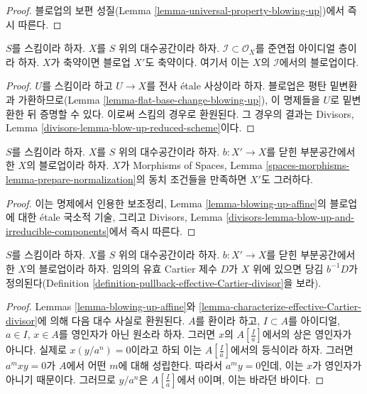 \begin{proof}
블로업의 보편 성질(Lemma
\ref{lemma-universal-property-blowing-up})에서 즉시 따른다.
\end{proof}

\begin{lemma}
\label{lemma-blow-up-reduced-space}
$S$를 스킴이라 하자. $X$를 $S$ 위의 대수공간이라 하자.
$\mathcal{I} \subset \mathcal{O}_X$를 준연접 아이디얼 층이라 하자.
$X$가 축약이면 블로업 $X'$도 축약이다. 여기서 이는 $X$의
$\mathcal{I}$에서의 블로업이다.
\end{lemma}

\begin{proof}
$U$를 스킴이라 하고 $U \to X$를 전사 \'etale 사상이라 하자.
블로업은 평탄 밑변환과 가환하므로(Lemma
\ref{lemma-flat-base-change-blowing-up}), 이 명제들을 $U$로
밑변환한 뒤 증명할 수 있다. 이로써 스킴의 경우로 환원된다. 그 경우의
결과는 Divisors, Lemma
\ref{divisors-lemma-blow-up-reduced-scheme}이다.
\end{proof}

\begin{lemma}
\label{lemma-blowup-finite-nr-irreducibles}
$S$를 스킴이라 하자. $X$를 $S$ 위의 대수공간이라 하자.
$b : X' \to X$를 닫힌 부분공간에서 한 $X$의 블로업이라 하자.
$X$가 Morphisms of Spaces, Lemma
\ref{spaces-morphisms-lemma-prepare-normalization}의 동치 조건들을
만족하면 $X'$도 그러하다.
\end{lemma}

\begin{proof}
이는 명제에서 인용한 보조정리, Lemma
\ref{lemma-blowing-up-affine}의 블로업에 대한 \'etale 국소적 기술,
그리고 Divisors, Lemma
\ref{divisors-lemma-blow-up-and-irreducible-components}에서 즉시 따른다.
\end{proof}

\begin{lemma}
\label{lemma-blow-up-pullback-effective-Cartier}
$S$를 스킴이라 하자. $X$를 $S$ 위의 대수공간이라 하자.
$b : X' \to X$를 닫힌 부분공간에서 한 $X$의 블로업이라 하자.
임의의 유효 Cartier 제수 $D$가 $X$ 위에 있으면 당김 $b^{-1}D$가
정의된다(Definition
\ref{definition-pullback-effective-Cartier-divisor}을 보라).
\end{lemma}

\begin{proof}
Lemmas \ref{lemma-blowing-up-affine}와
\ref{lemma-characterize-effective-Cartier-divisor}에 의해 다음 대수
사실로 환원된다. $A$를 환이라 하고, $I \subset A$를 아이디얼,
$a \in I$, $x \in A$를 영인자가 아닌 원소라 하자. 그러면
$x$의 $A[\frac{I}{a}]$에서의 상은 영인자가 아니다. 실제로
$x (y/a^n) = 0$이라고 하되 이는 $A[\frac{I}{a}]$에서의 등식이라 하자.
그러면 $a^mxy = 0$가 $A$에서 어떤 $m$에 대해 성립한다. 따라서
$a^my = 0$인데, 이는 $x$가 영인자가 아니기 때문이다. 그러므로
$y/a^n$은 $A[\frac{I}{a}]$에서 0이며, 이는 바라던 바이다.
\end{proof}

